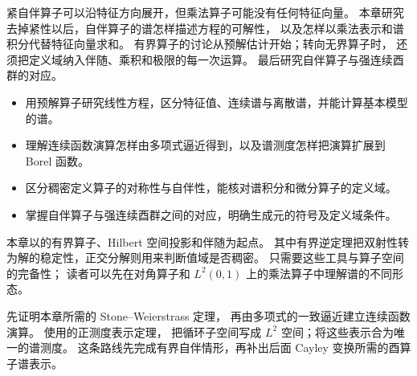 
\begin{chapterabstract}
紧自伴算子可以沿特征方向展开，但乘法算子可能没有任何特征向量。
本章研究去掉紧性以后，自伴算子的谱怎样描述方程的可解性，
以及怎样以乘法表示和谱积分代替特征向量求和。
有界算子的讨论从预解估计开始；转向无界算子时，
还须把定义域纳入伴随、乘积和极限的每一次运算。
最后研究自伴算子与强连续酉群的对应。
\end{chapterabstract}

\begin{learninggoals}
\begin{itemize}
\item\label{b1:item:29-goal-resolvent}用预解算子研究线性方程，区分特征值、连续谱与离散谱，并能计算基本模型的谱。
\item\label{b1:item:29-goal-calculus}理解连续函数演算怎样由多项式逼近得到，以及谱测度怎样把演算扩展到 Borel 函数。
\item\label{b1:item:29-goal-domain}区分稠密定义算子的对称性与自伴性，能核对谱积分和微分算子的定义域。
\item\label{b1:item:29-goal-group}掌握自伴算子与强连续酉群之间的对应，明确生成元的符号及定义域条件。
\end{itemize}
\end{learninggoals}

本章以的有界算子、Hilbert 空间投影和伴随为起点。
其中有界逆定理把双射性转为解的稳定性，正交分解则用来判断值域是否稠密。
只需要这些工具与算子空间的完备性；
读者可以先在对角算子和 \(L^2(0,1)\) 上的乘法算子中理解谱的不同形态。

\ProseParagraphBreak

先证明本章所需的 Stone--Weierstrass 定理，
再由多项式的一致逼近建立连续函数演算。
使用的正测度表示定理，
把循环子空间写成 \(L^2\) 空间；将这些表示合为唯一的谱测度。
这条路线先完成有界自伴情形，再补出后面 Cayley 变换所需的酉算子谱表示。


